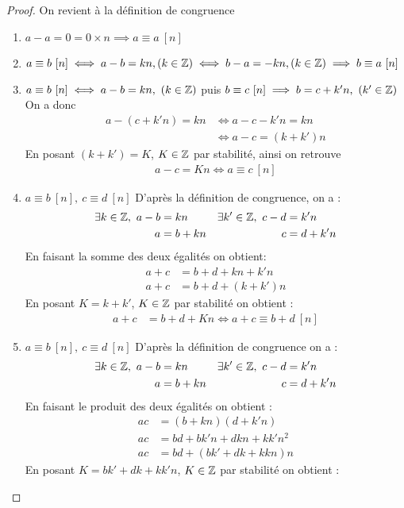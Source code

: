 \begin{proof}
On revient à la définition de congruence
\begin{enumerate}
\item $a - a = 0 = 0 \times n \implies a \equiv a \ [n]$
\item $a \equiv b \ [n] \iff a - b = kn, (k \in \Z) \iff b - a = -kn, (k \in \Z) \implies b \equiv a \ [n]$
\item $a \equiv b \ [n] \iff a - b = kn, \ (k \in \mathbb{Z})$ puis $b \equiv c \ [n] \implies b = c + k'n,\ (k' \in \mathbb{Z})$ On a donc
\begin{align*}
a - (c + k'n) = kn &\iff a - c - k'n = kn \\
				   &\iff a - c = (k + k')n 
\end{align*}
En posant $(k + k') = K$, $K \in \mathbb{Z}$ par stabilité, ainsi on retrouve 
\begin{align*}
a - c = Kn \iff a \equiv c \ [n]
\end{align*}  
\item 
$a \equiv b \ [n],\ c \equiv d \ [n]$ 
D'après la définition de congruence, on a :
\begin{align*}
\exists k \in \mathbb{Z},\ a - b &= kn & \exists k' \in \mathbb{Z},\ c - d &= k'n \\
a &= b + kn & c &= d + k'n
\end{align*}
En faisant la somme des deux égalités on obtient:
\begin{align*}
a + c &= b + d + kn + k'n \\
a + c &= b + d + (k + k')n
\end{align*}
En posant $K = k + k'$, $K \in \mathbb{Z}$ par stabilité on obtient :
\begin{align*}
a + c &= b + d + Kn \iff a + c \equiv b + d \ [n]
\end{align*}
\item 
$a \equiv b \ [n],\ c \equiv d \ [n]$ D'après la définition de congruence on a :
\begin{align*}
\exists k \in \mathbb{Z},\ a - b &= kn & \exists k' \in \mathbb{Z},\ c - d &= k'n \\
a &= b + kn & c &= d + k'n
\end{align*}
En faisant le produit des deux égalités on obtient :
\begin{align*}
ac &= (b + kn)(d + k'n) \\
ac &= bd + bk'n + dkn + kk'n^2 \\
ac &= bd + (bk' + dk +kkn)n
\end{align*}
En posant $K = bk' + dk + kk'n$, $K \in \mathbb{Z}$ par stabilité on obtient :

\end{enumerate}
\end{proof}
